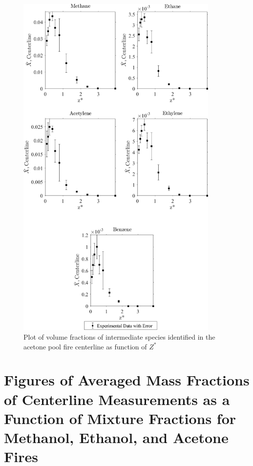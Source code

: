 \documentclass[12pt]{article}
\begin{document}
\begin{figure}[!h]
	\centering
\includegraphics[width=10.0cm,keepaspectratio]{Acetone_Inter_MOL_FRAC_Plot.png}
	\caption[Plot of volume fractions, with error, of intermediate species identified in the acetone pool fire centerline as function of $Z^{*}$]{Plot of volume fractions of intermediate species identified in the acetone pool fire centerline as function of $Z^{*}$}
	\label{fig:Methanol_VOL_Frac_Inter}
\end{figure}

\pagebreak

\section{Figures of Averaged Mass Fractions of Centerline Measurements as a Function of Mixture Fractions for Methanol, Ethanol, and Acetone Fires}\label{sec:Mix_Frac_Figs}
\end{document}
